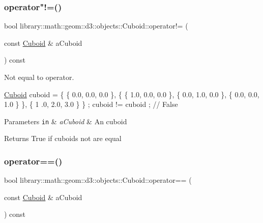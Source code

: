\subsubsection{\texorpdfstring{operator"!=()}{operator!=()}}
{\footnotesize\ttfamily bool library\+::math\+::geom\+::d3\+::objects\+::\+Cuboid\+::operator!= (\begin{DoxyParamCaption}\item[{const \hyperlink{classlibrary_1_1math_1_1geom_1_1d3_1_1objects_1_1_cuboid}{Cuboid} \&}]{a\+Cuboid }\end{DoxyParamCaption}) const}



Not equal to operator. 


\begin{DoxyCode}
\hyperlink{classlibrary_1_1math_1_1geom_1_1d3_1_1objects_1_1_cuboid_ac42299f962fab284a76a46d4ea4e6fa2}{Cuboid} cuboid = \{ \{ 0.0, 0.0, 0.0 \}, \{ \{ 1.0, 0.0, 0.0 \}, \{ 0.0, 1.0, 0.0 \}, \{ 0.0, 0.0, 1.0 \} \}, \{ 1
      .0, 2.0, 3.0 \} \} ;
cuboid != cuboid ; \textcolor{comment}{// False}
\end{DoxyCode}



\begin{DoxyParams}[1]{Parameters}
\mbox{\tt in}  & {\em a\+Cuboid} & An cuboid \\
\hline
\end{DoxyParams}
\begin{DoxyReturn}{Returns}
True if cuboids not are equal 
\end{DoxyReturn}
\mbox{\label{classlibrary_1_1math_1_1geom_1_1d3_1_1objects_1_1_cuboid_ae458fddf898e938729f41d645f64cd34}} 
\subsubsection{\texorpdfstring{operator==()}{operator==()}}
{\footnotesize\ttfamily bool library\+::math\+::geom\+::d3\+::objects\+::\+Cuboid\+::operator== (\begin{DoxyParamCaption}\item[{const \hyperlink{classlibrary_1_1math_1_1geom_1_1d3_1_1objects_1_1_cuboid}{Cuboid} \&}]{a\+Cuboid }\end{DoxyParamCaption}) const}



